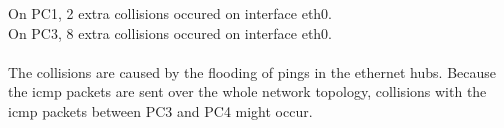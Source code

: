 On PC1, 2 extra collisions occured on interface eth0. \\
On PC3, 8 extra collisions occured on interface eth0. \\ \\

The collisions are caused by the flooding of pings in the ethernet hubs. Because the icmp packets are sent over the whole network topology, collisions with the icmp packets between PC3 and PC4 might occur.
